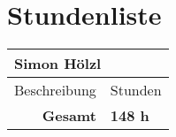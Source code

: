 \chapter{Stundenliste}
\begin{table}[h]
	\centering
	\begin{tabular}{|l|l|}
	\hline
		\multicolumn{2}{|l|}{\textbf{Simon Hölzl}} \\
	\hline
	Beschreibung & Stunden \\
	\hline
	
	\hline
		\multicolumn{1}{|r|}{\textbf{Gesamt}} & \textbf{148 h} \\
	\hline
	\end{tabular}
\end{table}
